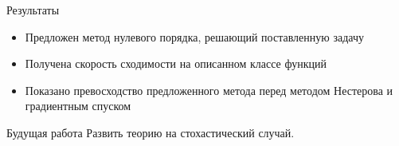\documentclass{beamer}
\begin{document}
\begin{frame}{Результаты}
\begin{itemize}
 \item Предложен метод нулевого порядка, решающий поставленную задачу
 \item Получена скорость сходимости на описанном классе функций
 \item Показано превосходство предложенного метода перед методом Нестерова и градиентным спуском
\end{itemize}

\begin{block}{Будущая работа}
 Развить теорию на стохастический случай.
\end{block}

\end{frame}
\end{document}

